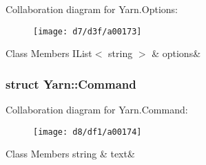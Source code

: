 Collaboration diagram for Yarn.\-Options\-:
\nopagebreak
\begin{figure}[H]
\begin{center}
\leavevmode
\texttt{[image: d7/d3f/a00173]}
\end{center}
\end{figure}
\begin{DoxyFields}{Class Members}
\hypertarget{a00026_ae8c616d923ceeeed192a9436c55d9917}{I\-List$<$ string $>$}\label{a00026_ae8c616d923ceeeed192a9436c55d9917}
&
options&
\\
\hline

\end{DoxyFields}
\label{d6/db8/a00158}
\hypertarget{a00026_d6/db8/a00158}{}
\subsubsection{struct Yarn\-:\-:Command}


Collaboration diagram for Yarn.\-Command\-:
\nopagebreak
\begin{figure}[H]
\begin{center}
\leavevmode
\texttt{[image: d8/df1/a00174]}
\end{center}
\end{figure}
\begin{DoxyFields}{Class Members}
\hypertarget{a00026_a8564e5104566e145f5d917ec846444d9}{string}\label{a00026_a8564e5104566e145f5d917ec846444d9}
&
text&
\\
\hline

\end{DoxyFields}


